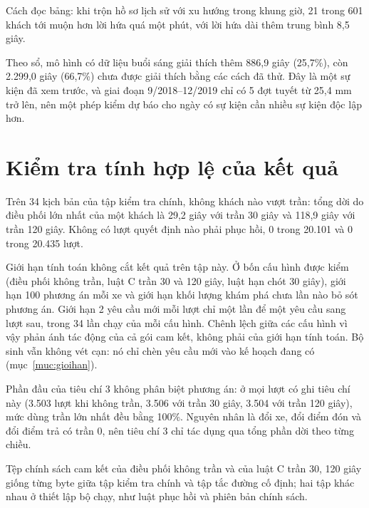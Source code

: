 Cách đọc bảng: khi trộn hồ sơ lịch sử với xu hướng trong khung giờ, 21 trong 601 khách tới muộn hơn lời hứa quá một
phút, với lời hứa dài thêm trung bình 8,5 giây.

Theo sổ, mô hình có dữ liệu buổi sáng giải thích thêm 886,9 giây (25,7\%), còn 2.299,0 giây (66,7\%) chưa được giải
thích bằng các cách đã thử. Đây là một sự kiện đã xem trước, và giai đoạn 9/2018--12/2019 chỉ có 5 đợt tuyết từ 25,4
mm trở lên, nên một phép kiểm dự báo cho ngày có sự kiện cần nhiều sự kiện độc lập hơn.

\section{Kiểm tra tính hợp lệ của kết quả}
\label{muc:c4-hople}

Trên 34 kịch bản của tập kiểm tra chính, không khách nào vượt trần: tổng dời do điều phối lớn nhất của một khách là
29,2 giây với trần 30 giây và 118,9 giây với trần 120 giây. Không có lượt quyết định nào phải phục hồi, 0 trong 20.101
và 0 trong 20.435 lượt.

Giới hạn tính toán không cắt kết quả trên tập này. Ở bốn cấu hình được kiểm (điều phối không trần, luật C trần 30 và
120 giây, luật hạn chót 30 giây), giới hạn 100 phương án mỗi xe và giới hạn khối lượng khám phá chưa lần nào bỏ sót
phương án. Giới hạn 2 yêu cầu mới mỗi lượt chỉ một lần để một yêu cầu sang lượt sau, trong 34 lần chạy của mỗi cấu
hình. Chênh lệch giữa các cấu hình vì vậy phản ánh tác động của cả gói cam kết, không phải của giới hạn tính toán. Bộ
sinh vẫn không vét cạn: nó chỉ chèn yêu cầu mới vào kế hoạch đang có (mục~\ref{muc:gioihan}).

Phần đầu của tiêu chí 3 không phân biệt phương án: ở mọi lượt có ghi tiêu chí này (3.503 lượt khi không trần, 3.506
với trần 30 giây, 3.504 với trần 120 giây), mức dùng trần lớn nhất đều bằng 100\%. Nguyên nhân là đổi xe, đổi điểm đón
và đổi điểm trả có trần 0, nên tiêu chí 3 chỉ tác dụng qua tổng phần dời theo từng chiều.

Tệp chính sách cam kết của điều phối không trần và của luật C trần 30, 120 giây giống từng byte giữa tập kiểm tra
chính và tập tắc đường cố định; hai tập khác nhau ở thiết lập bộ chạy, như luật phục hồi và phiên bản chính sách.

